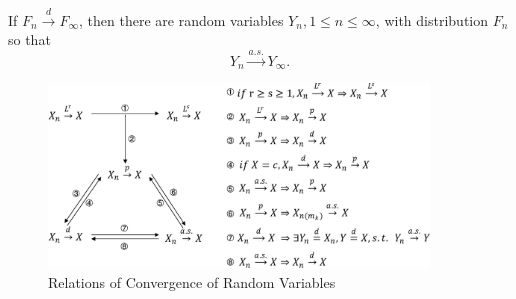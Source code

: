 \begin{lemma} \label{lem:distribution-to-probability}
    If $F_n\stackrel{d}{\rightarrow}F_\infty$, then there are random variables $Y_n,1\leq n\leq \infty$, with distribution $F_n$ so that
    \begin{equation}
        Y_n\stackrel{a.s.}{\rightarrow}Y_\infty.
    \end{equation}
\end{lemma}

\begin{figure}[htp]
    \centering
    \includegraphics[width=0.9\textwidth]{./probability-theory/figures/relation-of-convergences.eps}
    \caption{Relations of Convergence of Random Variables}
\end{figure}



